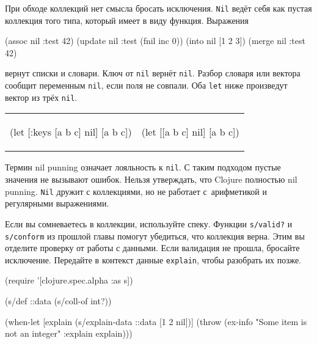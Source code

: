 При обходе коллекций нет смысла бросать исключения. \verb|Nil| ведёт себя как
пустая коллекция того типа, который имеет в виду функция. Выражения

\begin{english}
  \begin{clojure}
(assoc nil :test 42)
(update nil :test (fnil inc 0))
(into nil [1 2 3])
(merge nil {:test 42})
  \end{clojure}
\end{english}

\noindent
вернут списки и словари. Ключ от \verb|nil| вернёт \verb|nil|. Разбор
словаря или вектора сообщит переменным \verb|nil|, если поля не совпали. Оба
\verb|let| ниже произведут вектор из трёх \verb|nil|.

\begin{english}
\noindent
\begin{tabular}{ @{}p{5cm} @{}p{5cm} }

  \begin{clojure}
(let [{:keys [a b c]} nil]
  [a b c])
  \end{clojure}

&

  \begin{clojure}
(let [[a b c] nil]
  [a b c])
  \end{clojure}

\end{tabular}

\end{english}


Термин nil punning означает лояльность к \verb|nil|. С таким подходом
пустые значения не вызывают ошибок. Нельзя утверждать, что Clojure полностью
nil punning. \verb|Nil| дружит с коллекциями, но не работает с~арифметикой
и регулярными выражениями.


Если вы сомневаетесь в коллекции, используйте спеку. Функции \verb|s/valid?| и
\verb|s/conform| из прошлой главы  помогут убедиться, что
коллекция верна. Этим вы отделите проверку от работы с данными. Если валидация
не прошла, бросайте исключение. Передайте в контекст данные \verb|explain|,
чтобы разобрать их позже.

\ifx\devicetype\mobile

\begin{english}
  \begin{clojure}
(require '[clojure.spec.alpha :as s])

(s/def ::data (s/coll-of int?))

(when-let [explain (s/explain-data
                     ::data
                     [1 2 nil])]
  (throw (ex-info
           "Some item is not an integer"
           {:explain explain})))
  \end{clojure}
\end{english}

